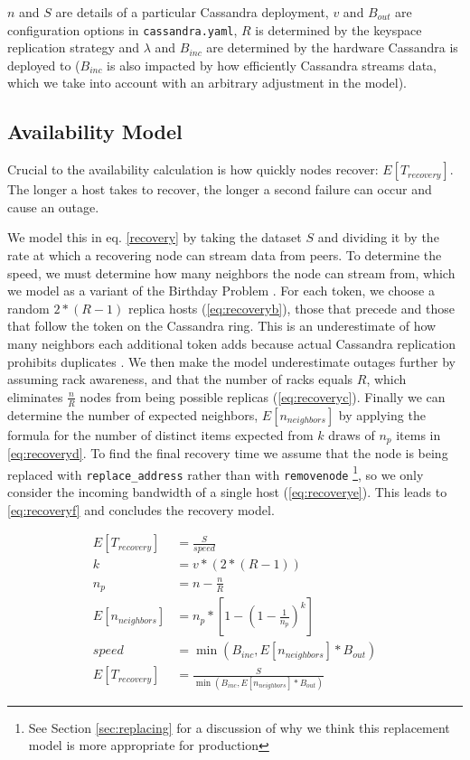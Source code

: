 \documentclass{article}
\begin{document}
$n$ and $S$ are details of a particular Cassandra deployment, $v$ and $B_{out}$
are configuration options in \texttt{cassandra.yaml}, $R$ is determined by the
keyspace replication strategy and $\lambda$ and $B_{inc}$ are determined by the
hardware Cassandra is deployed to ($B_{inc}$ is also impacted by how efficiently
Cassandra streams data, which we take into account with an arbitrary adjustment
in the model).

\subsection{Availability Model}

Crucial to the availability calculation is how quickly nodes recover:
$E[T_{recovery}]$. The longer a host takes to recover, the longer a second failure
can occur and cause an outage.

We model this in eq. \ref{recovery} by taking
the dataset $S$ and dividing it by the rate at which a recovering node can
stream data from peers. To determine the speed, we must determine how many neighbors
the node can stream from, which we model as a variant of the Birthday Problem
\cite{neighbors}. For each token, we choose a random $2 * (R - 1)$ replica hosts
(\ref{eq:recoveryb}), those that precede and those that follow the token on the
Cassandra ring. This is an underestimate of how many neighbors
each additional token adds because actual Cassandra replication prohibits
duplicates \cite{replication}. We then make the model underestimate outages
further by assuming rack awareness, and that the number of racks equals $R$, which
eliminates $\frac{n}{R}$ nodes from being possible replicas (\ref{eq:recoveryc}).
Finally we can determine the number of expected neighbors, $E[n_{neighbors}]$ by
applying the formula for the number of distinct items expected from $k$ draws of
$n_{p}$ items in \ref{eq:recoveryd}. To find the final recovery time we assume that
the node is being replaced with \texttt{replace\_address} rather than with
\texttt{removenode} \footnote{See Section \ref{sec:replacing} for a discussion of why
we think this replacement model is more appropriate for production}, so we only
consider the incoming bandwidth of a single host (\ref{eq:recoverye}).
This leads to \ref{eq:recoveryf} and concludes the recovery model.

\begin{subequations} \label{recovery}
    \begin{align}
        E[T_{recovery}] & = \frac{S}{speed} \\
        \label{eq:recoveryb}
        k & = v * (2 * (R - 1)) \\
        \label{eq:recoveryc}
        n_{p} & = n - \frac{n}{R} \\
        \label{eq:recoveryd}
        E[n_{neighbors}] & = n_{p} * [1 - (1-\frac{1}{n_{p}})^k] \\
        \label{eq:recoverye}
        speed & = \min(B_{inc}, E[n_{neighbors}] * B_{out}) \\
        \label{eq:recoveryf}
        E[T_{recovery}] & = \frac{S}{\min(B_{inc}, E[n_{neighbors}] * B_{out})}
    \end{align}
\end{subequations}
\end{document}
